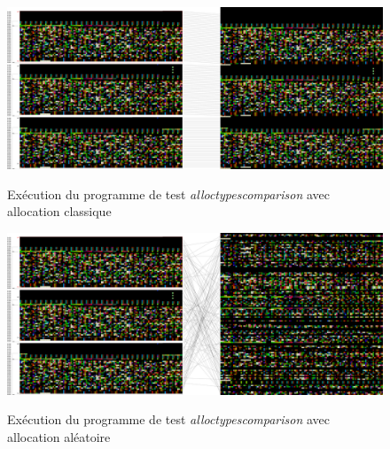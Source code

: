 \documentclass{article}
\begin{document}
\begin{figure}[h]
    \caption{Exécution du programme de test \textit{alloctypescomparison} avec allocation classique}
    \centering
    \includegraphics[width=\textwidth,height=\textheight,keepaspectratio]{memory_classic}
    \label{fig:alloc_classic}
\end{figure}

\begin{figure}[h]
    \caption{Exécution du programme de test \textit{alloctypescomparison} avec allocation aléatoire}
    \centering
    \includegraphics[width=\textwidth,height=\textheight,keepaspectratio]{memory_random}
    \label{fig:alloc_random}
\end{figure}
\end{document}
